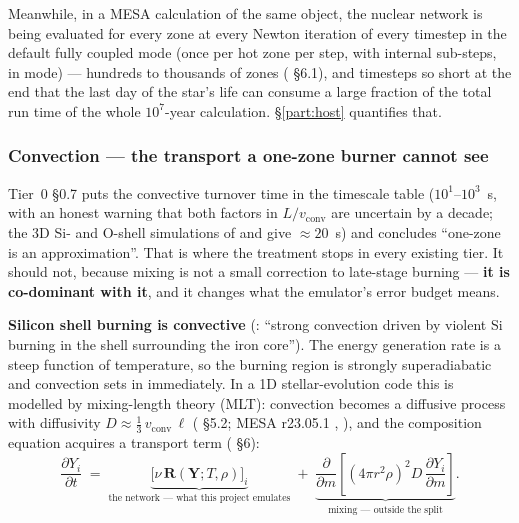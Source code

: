 Meanwhile, in a MESA calculation of the same object, the nuclear network is
being evaluated for every zone at every Newton iteration of every timestep in
the default fully coupled mode (once per hot zone per step, with internal
sub-steps, in  mode) --- hundreds to thousands of zones
(\citealt{paxton2011} \S6.1), and timesteps so short at the end that the last
day of the star's life can consume a large fraction of the total run time of the
whole $10^7$-year calculation. \S\ref{part:host} quantifies that.

\subsubsection{Convection --- the transport a one-zone burner cannot see}
\label{sec:convection}

Tier~0 \S0.7 puts the convective turnover time in the timescale table
($10^1$--$10^3$~s, with an honest warning that both factors in
$L/v_{\mathrm{conv}}$ are uncertain by a decade; the 3D Si- and O-shell
simulations of \citealt{couch2015} and \citealt{muller2016b} give
${\approx}20$~s) and concludes ``one-zone is an approximation''. That is where
the treatment stops in every existing tier. It should not, because mixing is
not a small correction to late-stage burning --- \textbf{it is co-dominant with
it}, and it changes what the emulator's error budget means.

\textbf{Silicon shell burning is convective} (\citealt{couch2015}: ``strong
convection driven by violent Si burning in the shell surrounding the iron
core''). The energy generation rate is a steep function of temperature, so the
burning region is strongly superadiabatic and convection sets in immediately. In
a 1D stellar-evolution code this is modelled by mixing-length theory (MLT):
convection becomes a diffusive process with diffusivity
$D \approx \tfrac13\, v_{\mathrm{conv}}\,\ell$ (\citealt{paxton2011} \S5.2;
MESA r23.05.1 ,
), and the composition equation acquires a
transport term (\citealt{paxton2011} \S6):
%
\begin{equation}
\frac{\partial Y_i}{\partial t}
\;=\; \underbrace{\big[\nu\,\mathbf R(\mathbf Y;T,\rho)\big]_i}_{\text{the network --- what this project emulates}}
\;+\;\underbrace{\frac{\partial}{\partial m}\!\left[(4\pi r^2\rho)^2 D\,\frac{\partial Y_i}{\partial m}\right]}_{\text{mixing --- outside the split}} .
\label{eq:burnmix}
\end{equation}

